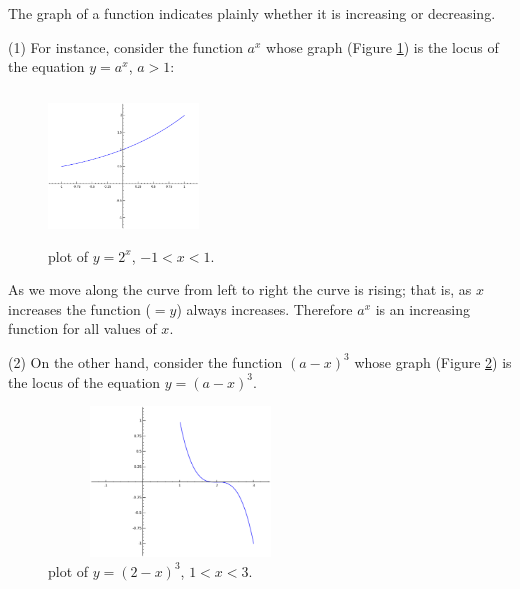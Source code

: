 The graph of a function indicates plainly whether it is 
increasing or decreasing. 

\begin{example}
{\rm
(1) For instance, consider the function $a^x$ whose graph 
(Figure \ref{fig:exp-fcn2}) is the locus of the equation
$y = a^x$, $a > 1$:

\begin{figure}[h!]
\begin{minipage}{\textwidth}
\begin{center}
\includegraphics[height=4cm,width=4cm]{exp-fcn2.eps}
\end{center}
\end{minipage}
\caption{\sage plot of $y=2^x$, $-1<x<1$.}
\label{fig:exp-fcn2}
\end{figure}

As we move along the curve from left to right the curve is rising; 
that is, as $x$ increases the function ($= y$) always increases. Therefore 
$a^x$ is an increasing function for all values of $x$.

(2) On the other hand, consider the function $(a - x)^3$ whose graph 
(Figure \ref{fig:cubic-fcn2}) is the locus of the equation $y = (a - x)^3$.

\begin{figure}[h!]
\begin{minipage}{\textwidth}
\begin{center}
\includegraphics[height=4cm,width=7cm]{cubic-fcn2.eps}
\end{center}
\end{minipage}
\caption{\sage plot of $y=(2-x)^3$, $1<x<3$.}
\label{fig:cubic-fcn2}
\end{figure}

}
\end{example}
